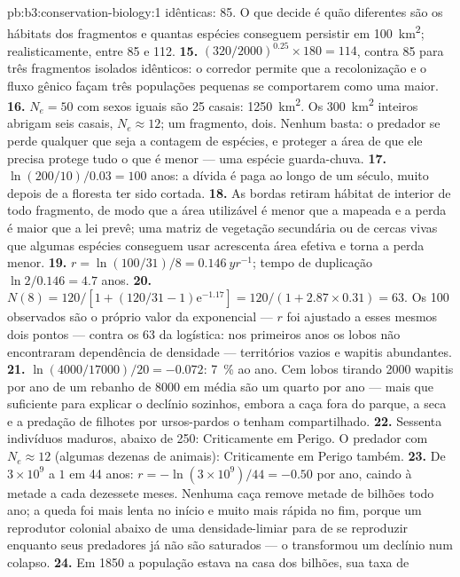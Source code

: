 \begin{solution}{pb:b3:conservation-biology:1}
idênticas: 85. O que decide é quão diferentes são os hábitats dos
fragmentos e quantas espécies conseguem persistir em \qty{100}{km^2};
realisticamente, entre 85 e 112.
\textbf{15.} $(320/2000)^{0.25}\times 180 = 114$, contra 85 para três
fragmentos isolados idênticos: o corredor permite que a recolonização e o
fluxo gênico façam três populações pequenas se comportarem como uma
maior.
\textbf{16.} $N_{e} = 50$ com sexos iguais são 25 casais:
\qty{1250}{km^2}. Os \qty{300}{km^2} inteiros abrigam seis casais, $N_{e} \approx 12$; um fragmento, dois. Nenhum basta: o predador se perde
qualquer que seja a contagem de espécies, e proteger a área de que ele
precisa protege tudo o que é menor --- uma espécie guarda-chuva.
\textbf{17.} $\ln(200/10)/0.03 = 100$ anos: a dívida é paga ao longo de um
século, muito depois de a floresta ter sido cortada.
\textbf{18.} As bordas retiram hábitat de interior de todo fragmento, de
modo que a área utilizável é menor que a mapeada e a perda é maior que a
lei prevê; uma matriz de vegetação secundária ou de cercas vivas que
algumas espécies conseguem usar acrescenta área efetiva e torna a perda
menor.
\textbf{19.} $r = \ln(100/31)/8 = \qty{0.146}{yr^{-1}}$; tempo de
duplicação $\ln 2/0.146 = 4.7$ anos.
\textbf{20.} $N(8) = 120/[1 + (120/31 - 1)\mathrm{e}^{-1.17}] = 120/(1 +
2.87\times 0.31) = 63$. Os 100 observados são o próprio valor da
exponencial --- $r$ foi ajustado a esses mesmos dois pontos --- contra
os 63 da logística: nos primeiros anos os lobos não encontraram
dependência de densidade --- territórios vazios e wapitis abundantes.
\textbf{21.} $\ln(4000/\num{17000})/20 = -0.072$: \qty{7}{\%} ao ano. Cem
lobos tirando \num{2000} wapitis por ano de um rebanho de \num{8000} em
média são um quarto por ano --- mais que suficiente para explicar o
declínio sozinhos, embora a caça fora do parque, a seca e a predação de
filhotes por ursos-pardos o tenham compartilhado.
\textbf{22.} Sessenta indivíduos maduros, abaixo de 250: Criticamente em
Perigo. O predador com $N_{e} \approx 12$ (algumas dezenas de animais):
Criticamente em Perigo também.
\textbf{23.} De $3\times 10^{9}$ a $1$ em 44 anos: $r = -\ln(3\times
10^{9})/44 = -0.50$ por ano, caindo à metade a cada dezessete meses.
Nenhuma caça remove metade de bilhões todo ano; a queda foi mais lenta no
início e muito mais rápida no fim, porque um reprodutor colonial abaixo
de uma densidade-limiar para de se reproduzir enquanto seus predadores já
não são saturados --- o  transformou um declínio num colapso.
\textbf{24.} Em 1850 a população estava na casa dos bilhões, sua taxa de

\end{solution}
